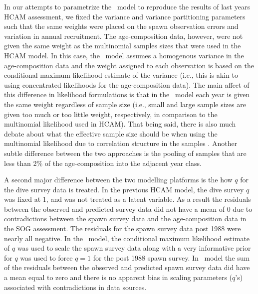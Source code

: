 In our attempts to parametrize the \iscam\ model to reproduce the results of last years HCAM assessment, we fixed the variance and variance partitioning parameters such that the same weights were placed on the spawn observation errors and variation in annual recruitment. The age-composition data, however, were not given the same weight as the multinomial samples sizes that were used in the HCAM model. In this case, the \iscam\ model assumes a homogenous variance in the age-composition data and the weight assigned to each observation is based on the conditional maximum likelihood estimate of the variance (i.e., this is akin to using concentrated likelihoods for the age-composition data).  The main affect of this difference in likelihood formulations is that in the \iscam\ model each year is given the same weight regardless of sample size (i.e., small and large sample sizes are given too much or too little weight, respectively, in comparison to the multinomial likelihood used in HCAM).  That being said, there is also much debate about what the effective sample size should be when using the multinomial likelihood due to correlation structure in the samples \citep[e.g.,][]{francis2011data}.  Another subtle difference between the two approaches is the pooling of samples that are less than 2\% of the age-composition into the adjacent year class.


A second major difference between the two modelling platforms is the how $q$ for the dive survey data is treated.  In the previous HCAM model, the dive survey $q$ was fixed at 1, and was not treated as a latent variable.  As a result the residuals between the observed and predicted survey data did not have a mean of 0 due to contradictions between the spawn survey data and the age-composition data in the SOG assessment. The residuals for the spawn survey data post 1988 were nearly all negative.  In the \iscam\ model, the conditional maximum likelihood estimate of $q$ was used to scale the spawn survey data along with a very informative prior for $q$ was used to force $q=1$ for the post 1988 spawn survey.  In \iscam\ model the sum of the residuals between the observed and predicted spawn survey data did have a mean equal to zero and there is no apparent bias in scaling parameters ($q$'s) associated with contradictions in data sources.

